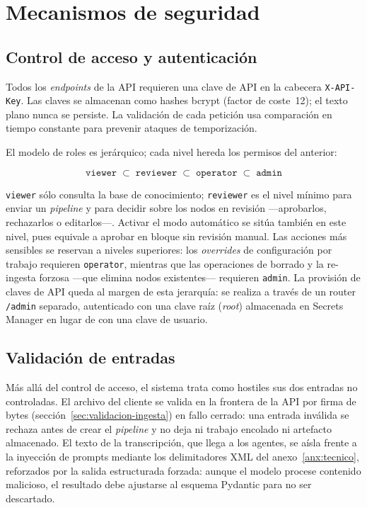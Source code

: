 \section{Mecanismos de seguridad}

\subsection{Control de acceso y autenticación}

Todos los \textit{endpoints} de la \ac{API} requieren una clave de \ac{API} en la cabecera
\texttt{X-API-Key}. Las claves se almacenan como hashes bcrypt (factor de coste~12); el texto
plano nunca se persiste. La validación de cada petición usa comparación en tiempo constante para
prevenir ataques de temporización.

El modelo de roles es jerárquico; cada nivel hereda los permisos del anterior:

\begin{equation*}
  \texttt{viewer} \;\subset\; \texttt{reviewer} \;\subset\; \texttt{operator} \;\subset\; \texttt{admin}
\end{equation*}

\texttt{viewer} sólo consulta la base de conocimiento; \texttt{reviewer} es el nivel mínimo para
enviar un \textit{pipeline} y para decidir sobre los nodos en revisión —aprobarlos, rechazarlos o
editarlos—. Activar el modo automático se sitúa también en este nivel, pues equivale a aprobar en
bloque sin revisión manual. Las acciones más sensibles se reservan a niveles superiores: los
\textit{overrides} de configuración por trabajo requieren \texttt{operator}, mientras que las
operaciones de borrado y la re-ingesta forzosa —que elimina nodos existentes— requieren
\texttt{admin}. La provisión de claves de \ac{API} queda al margen de esta jerarquía: se realiza a
través de un router \texttt{/admin} separado, autenticado con una clave raíz (\textit{root})
almacenada en Secrets Manager en lugar de con una clave de usuario.

\subsection{Validación de entradas}

Más allá del control de acceso, el sistema trata como hostiles sus dos entradas no controladas. El
archivo del cliente se valida en la frontera de la \ac{API} por firma de bytes
(sección~\ref{sec:validacion-ingesta}) en fallo cerrado: una entrada inválida se rechaza antes de
crear el \textit{pipeline} y no deja ni trabajo encolado ni artefacto almacenado. El texto de la
transcripción, que llega a los agentes, se aísla frente a la inyección de prompts mediante los
delimitadores XML del anexo~\ref{anx:tecnico}, reforzados por la salida estructurada forzada:
aunque el modelo procese contenido malicioso, el resultado debe ajustarse al esquema Pydantic para
no ser descartado.

